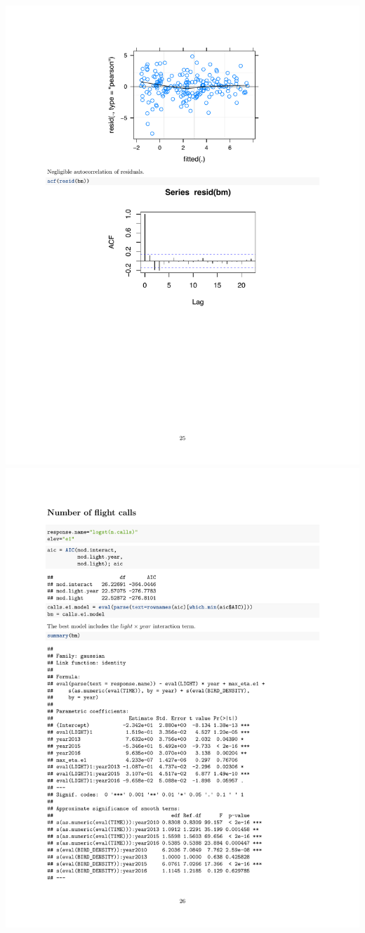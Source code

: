 \documentclass[a4paper, twoside]{templates/ociamthesis}
\begin{document}
\includegraphics[width=1\linewidth]{pdf_chapters/lights/lights_supp_crop_Part59}
\includegraphics[width=1\linewidth]{pdf_chapters/lights/lights_supp_crop_Part60}
\end{document}

